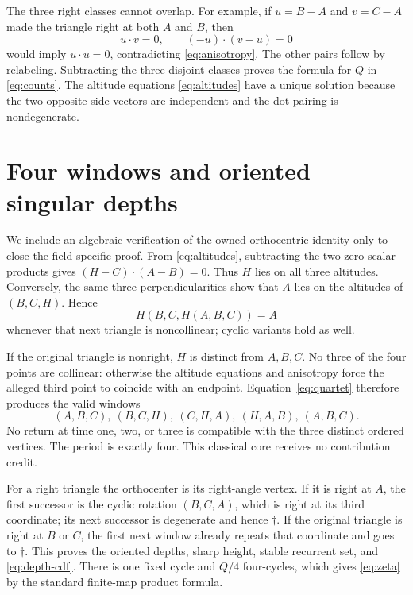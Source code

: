 \documentclass[a4paper,10pt]{amsart}
\theoremstyle{remark}
\begin{document}
The three right classes cannot overlap.  For example, if
$u=B-A$ and $v=C-A$ made the triangle right at both $A$ and $B$, then
\[
 u\cdot v=0,\qquad (-u)\cdot(v-u)=0
\]
would imply $u\cdot u=0$, contradicting \eqref{eq:anisotropy}.  The other
pairs follow by relabeling.  Subtracting the three disjoint classes proves
the formula for $Q$ in \eqref{eq:counts}.  The altitude equations
\eqref{eq:altitudes} have a unique solution because the two opposite-side
vectors are independent and the dot pairing is nondegenerate.

\section{Four windows and oriented singular depths}\label{sec:forward}

We include an algebraic verification of the owned orthocentric identity only
to close the field-specific proof.  From \eqref{eq:altitudes}, subtracting the
two zero scalar products gives
$(H-C)\cdot(A-B)=0$.  Thus $H$ lies on all three altitudes.  Conversely,
the same three perpendicularities show that $A$ lies on the altitudes of
$(B,C,H)$.  Hence
\begin{equation}\label{eq:quartet}
 H(B,C,H(A,B,C))=A
\end{equation}
whenever that next triangle is noncollinear; cyclic variants hold as well.

If the original triangle is nonright, $H$ is distinct from $A,B,C$.  No
three of the four points are collinear: otherwise the altitude equations and
anisotropy force the alleged third point to coincide with an endpoint.
Equation~\eqref{eq:quartet} therefore produces the valid windows
\begin{equation}\label{eq:four-windows}
 (A,B,C),\ (B,C,H),\ (C,H,A),\ (H,A,B),\ (A,B,C).
\end{equation}
No return at time one, two, or three is compatible with the three distinct
ordered vertices.  The period is exactly four.  This classical core receives
no contribution credit.

For a right triangle the orthocenter is its right-angle vertex.  If it is
right at $A$, the first successor is the cyclic rotation $(B,C,A)$, which is
right at its third coordinate; its next successor is degenerate and hence
$\dagger$.  If the original triangle is right at $B$ or $C$, the first next
window already repeats that coordinate and goes to $\dagger$.  This proves
the oriented depths, sharp height, stable recurrent set, and
\eqref{eq:depth-cdf}.  There is one fixed cycle and $Q/4$ four-cycles, which
gives \eqref{eq:zeta} by the standard finite-map product formula.
\end{document}
